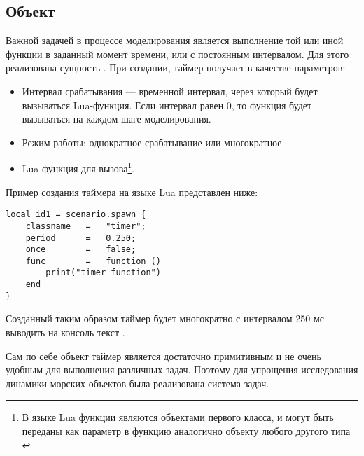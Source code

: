 %

\subsection{Объект }

Важной задачей в процессе моделирования является выполнение той или иной функции в заданный момент времени, или с постоянным интервалом. Для этого реализована сущность . При создании, таймер получает в качестве параметров:
\begin{itemize}
	\item	Интервал срабатывания --- временной интервал, через который будет вызываться Lua-функция. Если интервал равен $0$, то функция будет вызываться на каждом шаге моделирования.
	\item	Режим работы: однократное срабатывание или многократное.
	\item	Lua-функция для вызова\footnote{В языке Lua функции являются объектами первого класса, и могут быть переданы как параметр в функцию аналогично объекту любого другого типа \citep{implua}}.
\end{itemize}

Пример создания таймера на языке Lua представлен ниже:

\begin{lstlisting}[caption={Пример создания таймера}]
local id1 = scenario.spawn {
    classname   =   "timer";
    period      =   0.250;         
    once        =   false;      
    func        =   function () 
        print("timer function")
    end
}
\end{lstlisting}

Созданный таким образом таймер будет многократно с интервалом 250 мс выводить на консоль текст .

Сам по себе объект таймер является достаточно примитивным и не очень удобным для выполнения различных задач. 
Поэтому для упрощения исследования динамики морских объектов была реализована система задач.

